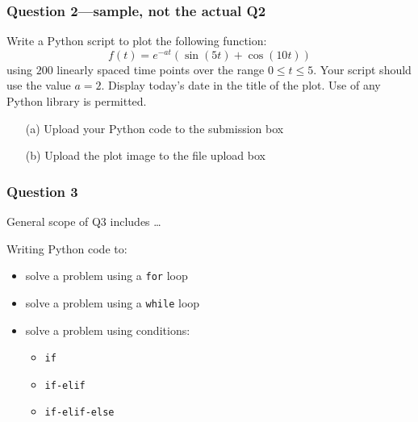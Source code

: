 \documentclass[english,14pt]{beamer}
\begin{document}

\begin{frame}[fragile]

\frametitle{Question 2---sample, not the actual Q2}

Write a Python script to plot the following function:
\[
f(t) = e^{-at}\left( \sin(5t) + \cos(10t)\right)
\]
using $200$ linearly spaced time points over the range $0 \leq t \leq 5$. Your script should use the value $a = 2$. Display today's date in the title of the plot. Use of any Python library is permitted.

\begin{itemize}
\item[(a)] Upload your Python code to the submission box
\item[(b)] Upload the plot image to the file upload box
\end{itemize}

\end{frame}


\begin{frame}[fragile]

\frametitle{Question 3}

General scope of Q3 includes \ldots

\vspace*{5mm}

Writing Python code to:

\begin{itemize}
	\item solve a problem using a \texttt{for} loop
	\item[]
	\item solve a problem using a \texttt{while} loop
	\item[]
	\item solve a problem using conditions:
	\begin{itemize}
		\item \texttt{if}
		\item \texttt{if-elif}
		\item \texttt{if-elif-else}
	\end{itemize}
\end{itemize}

\end{frame}

\end{document}
